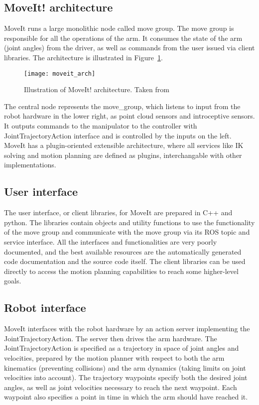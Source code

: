 \documentclass[buriama8_dp.tex]{subfiles}
\begin{document}
\subsection{MoveIt! architecture}
\label{subsec:mvt_arch}

MoveIt runs a large monolithic node called move group. The move group is responsible for all the operations of the arm. It consumes the state of the arm (joint angles) from the driver, as well as commands from the user issued via client libraries. The architecture is illustrated in Figure~\ref{fig:moveit_arch}.

\begin{figure}[ht]
  \centering
  \texttt{[image: moveit\_arch]}
  \caption[MoveIt! architecture]{Illustration of MoveIt! architecture. Taken from \cite{moveit_docs}}
  \label{fig:moveit_arch}
\end{figure}

The central node represents the move\_group, which listens to input from the robot hardware in the lower right, as point cloud sensors and introceptive sensors. It outputs commands to the manipulator to the controller with JointTrajectoryAction interface and is controlled by the inputs on the left. MoveIt has a plugin-oriented extensible architecture, where all services like IK solving and motion planning are defined as plugins, interchangable with other implementations.

\subsection{User interface}
\label{subsec:moveit_ui}

The user interface, or client libraries, for MoveIt are prepared in C++ and python. The libraries contain objects and utility functions to use the functionality of the move group and communicate with the move group via its ROS topic and service interface. All the interfaces and functionalities are very poorly documented, and the best available resources are the automatically generated code documentation and the source code itself. The client libraries can be used directly to access the motion planning capabilities to reach some higher-level goals.


\subsection{Robot interface}
\label{subsec:moveit_ri}

MoveIt interfaces with the robot hardware by an action server implementing the JointTrajectoryAction. The server then drives the arm hardware. The JointTrajectoryAction is specified as a trajectory in space of joint angles and velocities, prepared by the motion planner with respect to both the arm kinematics (preventing collisions) and the arm dynamics (taking limits on joint velocities into account). The trajectory waypoints specify both the desired joint angles, as well as joint velocities necessary to reach the next waypoint. Each waypoint also specifies a point in time in which the arm should have reached it.
\end{document}
